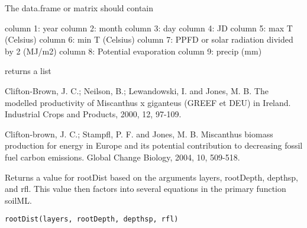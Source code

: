 \documentclass[letterpaper]{book}
\begin{document}
%
\begin{Details}\relax
The data.frame or matrix should contain

column 1: year column 2: month column 3: day column 4: JD
column 5: max T (Celsius) column 6: min T (Celsius)
column 7: PPFD or solar radiation divided by 2 (MJ/m2)
column 8: Potential evaporation column 9: precip (mm)
\end{Details}
%
\begin{Value}
returns a list
\end{Value}
%
\begin{References}\relax
Clifton-Brown, J. C.; Neilson, B.; Lewandowski, I. and
Jones, M. B. The modelled productivity of Miscanthus x
giganteus (GREEF et DEU) in Ireland. Industrial Crops and
Products, 2000, 12, 97-109.

Clifton-brown, J. C.; Stampfl, P. F. and Jones, M. B.
Miscanthus biomass production for energy in Europe and
its potential contribution to decreasing fossil fuel
carbon emissions. Global Change Biology, 2004, 10,
509-518.
\end{References}
%
\begin{Examples}
\end{Examples}
%
\begin{Description}\relax
Returns a value for rootDist based on the arguments layers,
rootDepth, depthsp, and rfl. This value then factors into
several equations in the primary function soilML.
\end{Description}
%
\begin{Usage}
\begin{verbatim}
rootDist(layers, rootDepth, depthsp, rfl)
\end{verbatim}
\end{Usage}
\end{document}
